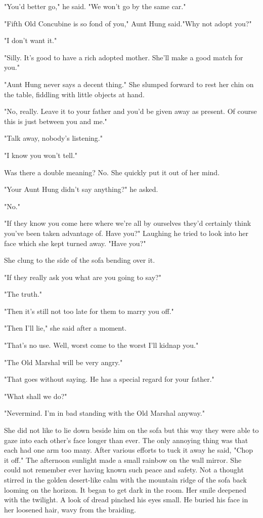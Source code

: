 \par "You'd better go," he said. "We won't go by the same car."
\par "Fifth Old Concubine is so fond of you," Aunt Hung said."Why not adopt you?"
\par "I don't want it."
\par "Silly. It's good to have a rich adopted mother. She'll make a good match for you."
\par "Aunt Hung never says a decent thing." She slumped forward to rest her chin on the table, fiddling with little objects at hand.
\par "No, really. Leave it to your father and you'd be given away as present. Of course this is just between you and me."
\par "Talk away, nobody's listening."
\par "I know you won't tell."
\par Was there a double meaning? No. She quickly put it out of her mind.
\par "Your Aunt Hung didn't say anything?" he asked.
\par "No."
\par "If they know you come here where we're all by ourselves they'd certainly think you've been taken advantage of. Have you?" Laughing he tried to look into her face which she kept turned away. "Have you?"
\par She clung to the side of the sofa bending over it.
\par "If they really ask you what are you going to say?"
\par "The truth."
\par "Then it's still not too late for them to marry you off."
\par "Then I'll lie," she said after a moment.
\par "That's no use. Well, worst come to the worst I'll kidnap you."
\par "The Old Marshal will be very angry."
\par "That goes without saying. He has a special regard for your father."
\par "What shall we do?"
\par "Nevermind. I'm in bad standing with the Old Marshal anyway."
\par She did not like to lie down beside him on the sofa but this way they were able to gaze into each other's face longer than ever. The only annoying thing was that each had one arm too many. After various efforts to tuck it away he said, "Chop it off." The afternoon sunlight made a small rainbow on the wall mirror. She could not remember ever having known such peace and safety. Not a thought stirred in the golden desert-like calm with the mountain ridge of the sofa back looming on the horizon. It began to get dark in the room. Her smile deepened with the twilight. A look of dread pinched his eyes small. He buried his face in her loosened hair, wavy from the braiding.

